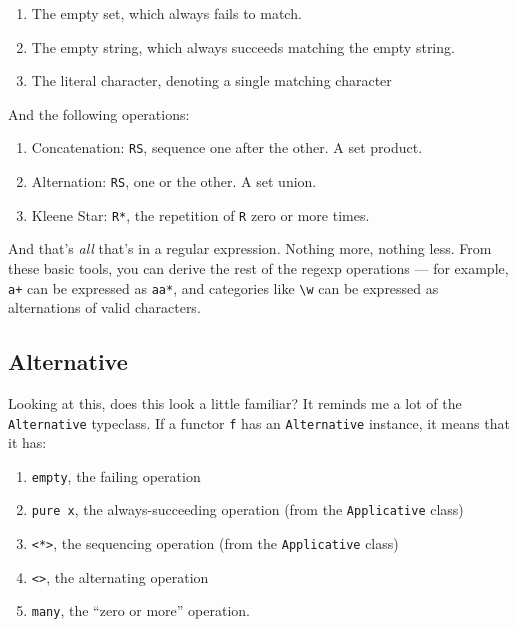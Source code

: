 \documentclass[]{article}
\begin{document}
\begin{enumerate}
\def\labelenumi{\arabic{enumi}.}
\tightlist
\item
  The empty set, which always fails to match.
\item
  The empty string, which always succeeds matching the empty string.
\item
  The literal character, denoting a single matching character
\end{enumerate}

And the following operations:

\begin{enumerate}
\def\labelenumi{\arabic{enumi}.}
\tightlist
\item
  Concatenation: \texttt{RS}, sequence one after the other. A set product.
\item
  Alternation: \texttt{R\textbar{}S}, one or the other. A set union.
\item
  Kleene Star: \texttt{R*}, the repetition of \texttt{R} zero or more times.
\end{enumerate}

And that's \emph{all} that's in a regular expression. Nothing more, nothing
less. From these basic tools, you can derive the rest of the regexp operations
--- for example, \texttt{a+} can be expressed as \texttt{aa*}, and categories
like \texttt{\textbackslash{}w} can be expressed as alternations of valid
characters.

\subsection{Alternative}\label{alternative}

Looking at this, does this look a little familiar? It reminds me a lot of the
\texttt{Alternative} typeclass. If a functor \texttt{f} has an
\texttt{Alternative} instance, it means that it has:

\begin{enumerate}
\def\labelenumi{\arabic{enumi}.}
\tightlist
\item
  \texttt{empty}, the failing operation
\item
  \texttt{pure\ x}, the always-succeeding operation (from the
  \texttt{Applicative} class)
\item
  \texttt{\textless{}*\textgreater{}}, the sequencing operation (from the
  \texttt{Applicative} class)
\item
  \texttt{\textless{}\textbar{}\textgreater{}}, the alternating operation
\item
  \texttt{many}, the ``zero or more'' operation.
\end{enumerate}
\end{document}

